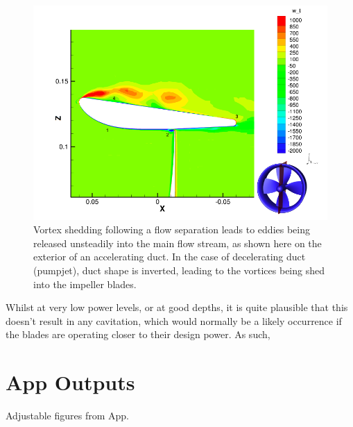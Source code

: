 \documentclass{article}\usepackage[]{graphicx}\usepackage[]{color}
\begin{document}
\begin{figure}
\includegraphics[width=\textwidth]{VortexShedding.png}
\caption{Vortex shedding following a flow separation leads to eddies being released unsteadily into the main flow stream, as shown here on the exterior of an accelerating duct.  In the case of decelerating duct (pumpjet), duct shape is inverted, leading to the vortices being shed into the impeller blades. \parencite{willemsen2013}}
\label{fig:VortexShedding.png}
\end{figure}

Whilst at very low power levels, or at good depths, it is quite plausible that this doesn't result in any cavitation, which would normally be a likely occurrence if the blades are operating closer to their design power. As such,

\section{App Outputs}

Adjustable figures from App.
\end{document}
